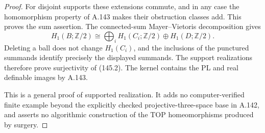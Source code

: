 \begin{proof}
For disjoint supports these extensions commute, and in any case
the homomorphism property of A.143 makes their obstruction classes
add. This proves the sum assertion. The connected-sum
Mayer--Vietoris decomposition gives
\[
 H_1(B;\mathbb Z/2)\cong
       \bigoplus_i H_1(C_i;\mathbb Z/2)\oplus H_1(D;\mathbb Z/2).
 \tag{145.8}
\]
Deleting a ball does not change $H_1(C_i)$, and the inclusions of
the punctured summands identify precisely the displayed summands.
The support realizations therefore prove surjectivity of (145.2).
The kernel contains the PL and real definable images by A.143.

This is a general proof of supported realization. It adds no
computer-verified finite example beyond the explicitly checked
projective-three-space base in A.142, and asserts no algorithmic
construction of the TOP homeomorphisms produced by surgery.
\end{proof}


